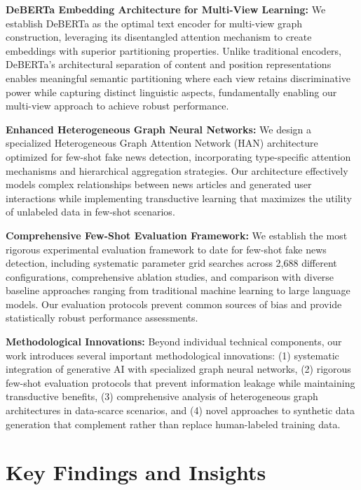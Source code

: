 \textbf{DeBERTa Embedding Architecture for Multi-View Learning:} We establish DeBERTa as the optimal text encoder for multi-view graph construction, leveraging its disentangled attention mechanism to create embeddings with superior partitioning properties. Unlike traditional encoders, DeBERTa's architectural separation of content and position representations enables meaningful semantic partitioning where each view retains discriminative power while capturing distinct linguistic aspects, fundamentally enabling our multi-view approach to achieve robust performance.

\textbf{Enhanced Heterogeneous Graph Neural Networks:} We design a specialized Heterogeneous Graph Attention Network (HAN) architecture optimized for few-shot fake news detection, incorporating type-specific attention mechanisms and hierarchical aggregation strategies. Our architecture effectively models complex relationships between news articles and generated user interactions while implementing transductive learning that maximizes the utility of unlabeled data in few-shot scenarios.


\textbf{Comprehensive Few-Shot Evaluation Framework:} We establish the most rigorous experimental evaluation framework to date for few-shot fake news detection, including systematic parameter grid searches across 2,688 different configurations, comprehensive ablation studies, and comparison with diverse baseline approaches ranging from traditional machine learning to large language models. Our evaluation protocols prevent common sources of bias and provide statistically robust performance assessments.

\textbf{Methodological Innovations:} Beyond individual technical components, our work introduces several important methodological innovations: (1) systematic integration of generative AI with specialized graph neural networks, (2) rigorous few-shot evaluation protocols that prevent information leakage while maintaining transductive benefits, (3) comprehensive analysis of heterogeneous graph architectures in data-scarce scenarios, and (4) novel approaches to synthetic data generation that complement rather than replace human-labeled training data.

\section{Key Findings and Insights}

